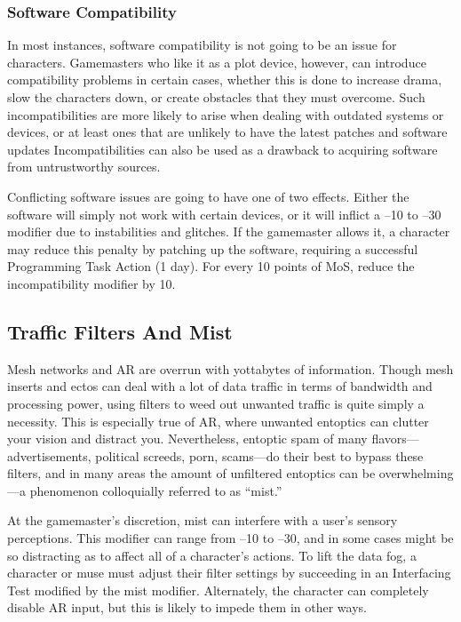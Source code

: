 \subsubsection{Software Compatibility} 

In most instances, software compatibility is not going to be an issue for characters. Gamemasters who like it as a plot device, however, can introduce compatibility problems in certain cases, whether this is done to increase drama, slow the characters down, or create obstacles that they must overcome. Such incompatibilities are more likely to arise when dealing with outdated systems or devices, or at least ones that are unlikely to have the latest patches and software updates Incompatibilities can also be used as a drawback to acquiring software from untrustworthy sources. 

Conflicting software issues are going to have one of two effects. Either the software will simply not work with certain devices, or it will inflict a –10 to –30 modifier due to instabilities and glitches. If the gamemaster allows it, a character may reduce this penalty by patching up the software, requiring a successful Programming Task Action (1 day). For every 10 points of MoS, reduce the incompatibility modifier by 10. 

\subsection{Traffic Filters And Mist} 

Mesh networks and AR are overrun with yottabytes of information. Though mesh inserts and ectos can deal with a lot of data traffic in terms of bandwidth and processing power, using filters to weed out unwanted traffic is quite simply a necessity. This is especially true of AR, where unwanted entoptics can clutter your vision and distract you. Nevertheless, entoptic spam of many flavors—advertisements, political screeds, porn, scams—do their best to bypass these filters, and in many areas the amount of unfiltered entoptics can be overwhelming—a phenomenon colloquially referred to as ``mist.'' 

At the gamemaster's discretion, mist can interfere with a user's sensory perceptions. This modifier can range from –10 to –30, and in some cases might be so distracting as to affect all of a character's actions. To lift the data fog, a character or muse must adjust their filter settings by succeeding in an Interfacing Test modified by the mist modifier. Alternately, the character can completely disable AR input, but this is likely to impede them in other ways. 

